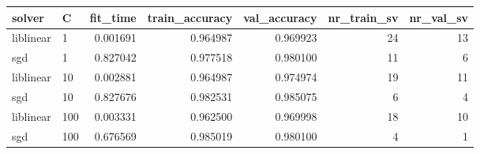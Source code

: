 \begin{tabular}{llrrrrr}
\toprule
   solver &   C &  fit\_time &  train\_accuracy &  val\_accuracy &  nr\_train\_sv &  nr\_val\_sv \\
\midrule
liblinear &   1 &  0.001691 &        0.964987 &      0.969923 &           24 &         13 \\
      sgd &   1 &  0.827042 &        0.977518 &      0.980100 &           11 &          6 \\
liblinear &  10 &  0.002881 &        0.964987 &      0.974974 &           19 &         11 \\
      sgd &  10 &  0.827676 &        0.982531 &      0.985075 &            6 &          4 \\
liblinear & 100 &  0.003331 &        0.962500 &      0.969998 &           18 &         10 \\
      sgd & 100 &  0.676569 &        0.985019 &      0.980100 &            4 &          1 \\
\bottomrule
\end{tabular}
